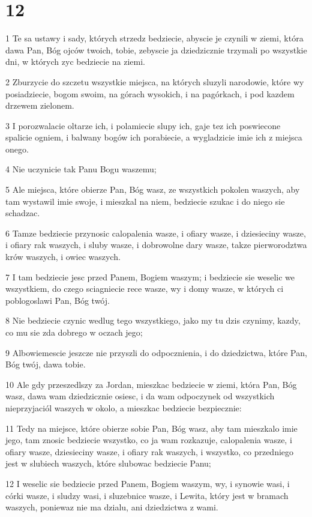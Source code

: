 \chapter{12}

\par 1 Te sa ustawy i sady, których strzedz bedziecie, abyscie je czynili w ziemi, która dawa Pan, Bóg ojców twoich, tobie, zebyscie ja dziedzicznie trzymali po wszystkie dni, w których zyc bedziecie na ziemi.
\par 2 Zburzycie do szczetu wszystkie miejsca, na których sluzyli narodowie, które wy posiadziecie, bogom swoim, na górach wysokich, i na pagórkach, i pod kazdem drzewem zielonem.
\par 3 I porozwalacie oltarze ich, i polamiecie slupy ich, gaje tez ich poswiecone spalicie ogniem, i balwany bogów ich porabiecie, a wygladzicie imie ich z miejsca onego.
\par 4 Nie uczynicie tak Panu Bogu waszemu;
\par 5 Ale miejsca, które obierze Pan, Bóg wasz, ze wszystkich pokolen waszych, aby tam wystawil imie swoje, i mieszkal na niem, bedziecie szukac i do niego sie schadzac.
\par 6 Tamze bedziecie przynosic calopalenia wasze, i ofiary wasze, i dziesieciny wasze, i ofiary rak waszych, i sluby wasze, i dobrowolne dary wasze, takze pierworodztwa krów waszych, i owiec waszych.
\par 7 I tam bedziecie jesc przed Panem, Bogiem waszym; i bedziecie sie weselic we wszystkiem, do czego sciagniecie rece wasze, wy i domy wasze, w których ci poblogoslawi Pan, Bóg twój.
\par 8 Nie bedziecie czynic wedlug tego wszystkiego, jako my tu dzis czynimy, kazdy, co mu sie zda dobrego w oczach jego;
\par 9 Albowiemescie jeszcze nie przyszli do odpocznienia, i do dziedzictwa, które Pan, Bóg twój, dawa tobie.
\par 10 Ale gdy przeszedlszy za Jordan, mieszkac bedziecie w ziemi, która Pan, Bóg wasz, dawa wam dziedzicznie osiesc, i da wam odpoczynek od wszystkich nieprzyjaciól waszych w okolo, a mieszkac bedziecie bezpiecznie:
\par 11 Tedy na miejsce, które obierze sobie Pan, Bóg wasz, aby tam mieszkalo imie jego, tam znosic bedziecie wszystko, co ja wam rozkazuje, calopalenia wasze, i ofiary wasze, dziesieciny wasze, i ofiary rak waszych, i wszystko, co przedniego jest w slubiech waszych, które slubowac bedziecie Panu;
\par 12 I weselic sie bedziecie przed Panem, Bogiem waszym, wy, i synowie wasi, i córki wasze, i sludzy wasi, i sluzebnice wasze, i Lewita, który jest w bramach waszych, poniewaz nie ma dzialu, ani dziedzictwa z wami.
